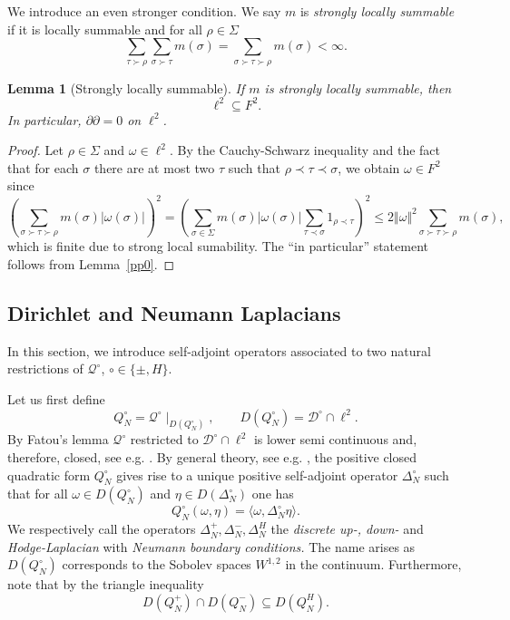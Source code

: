 \documentclass[10pt]{amsart}
\newtheorem{lemma}[theorem]{Lemma}
\theoremstyle{definition}
\newcommand{\F}{{F}}
\renewcommand{\bullet}{{\circ}}
\newcommand{\Q}{\mathcal{Q}}
\begin{document}
  We introduce an even stronger condition. We say $m$ is \emph{strongly locally summable} if it is locally summable and for all $\rho\in \Sigma$      $$\sum_{\tau\succ \rho}\sum_{\sigma\succ\tau}m(\sigma)=\sum_{\sigma\succ\tau\succ \rho}m(\sigma)<\infty.$$ 
  \begin{lemma}[Strongly locally summable]\label{sammellemma3} If $m$ is strongly locally summable, then
  	$$\ell^2\subseteq\F^2.$$
  	In particular, $\partial\partial=0$ on $\ell^{2}$.
  \end{lemma}
  \begin{proof}
  	Let $\rho\in\Sigma$ and $\omega\in\ell^2.$ By the Cauchy-Schwarz inequality and the fact that for each $\sigma$ there are at most two $\tau$ such that $\rho\prec\tau \prec \sigma$, we obtain $\omega\in F^{2}$ since
  \begin{equation*}
  		\left(\sum_{\sigma\succ \tau\succ\rho}m(\sigma)\vert\omega(\sigma)\vert\right)^2=\left(\sum_{\sigma\in \Sigma}m(\sigma)\vert\omega(\sigma)\vert\sum_{\tau\prec\sigma}1_{\rho\prec \tau}\right)^2\leq   2\Vert\omega\Vert^2\sum_{\sigma\succ \tau\succ\rho} m(\sigma),
  \end{equation*}
  which is finite due to strong local sumability. The ``in particular'' statement follows from Lemma~\ref{pp0}.  \end{proof}
 

\subsection{Dirichlet and Neumann Laplacians}\label{Dir&Neum}
In this section, we introduce self-adjoint operators associated to two natural 
restrictions of $\mathcal{Q}^{\bullet}$, $\bullet\in\{\pm, H\}$.

Let us first  define 
$$Q^\bullet_N = \Q^\bullet\mid_{D(Q^\bullet_N)}, \qquad D(Q^\bullet_N) = \mathcal{D}^\bullet\cap \ell^2.
	$$
By Fatou's lemma $\Q^{\bullet}$ restricted to $\mathcal{D}^{\circ}\cap \ell^{2}$ is lower semi continuous and, therefore,  closed, see e.g. \cite[Theorem B.9]{KLW}.  By general theory, see e.g. \cite[Theorem 5.37]{W}, the positive closed quadratic form $Q^{\bullet}_{N}$ gives rise to a
 unique positive self-adjoint operator $\Delta^\bullet_N$ such that for all $\omega\in D(Q^\bullet_N)$ and $\eta\in D(\Delta^\bullet_N)$ one has
$$Q^\bullet_N(\omega,\eta) = \langle \omega,\Delta^\bullet_N\eta\rangle.$$ 
We respectively call the operators $\Delta^+_N,\Delta^-_N,\Delta^H_N$ the \textit{discrete up-, down-} and \textit{Hodge-Laplacian} with \textit{Neumann boundary conditions.} The name arises as $D(Q^{\bullet}_{N})$ corresponds  to the Sobolev spaces $W^{1,2}$ in the continuum.
Furthermore, note that by the triangle inequality $$D(Q^+_N)\cap D(Q^-_N)\subseteq D(Q^H_N).$$ 
\end{document}
